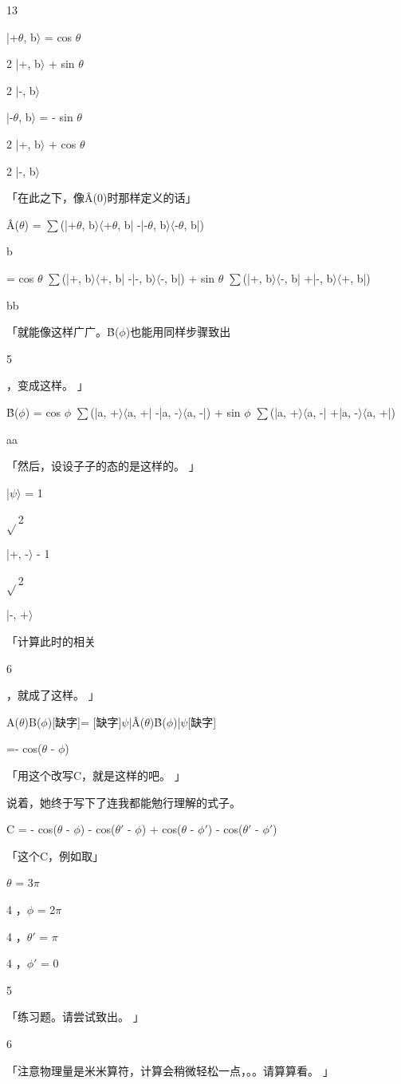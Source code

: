 13\par
|+$\theta$, b$\rangle$ = cos $\theta$\par
2 |+, b$\rangle$ + sin $\theta$\par
2 |-, b$\rangle$\par
|-$\theta$, b$\rangle$ = - sin $\theta$\par
2 |+, b$\rangle$ + cos $\theta$\par
2 |-, b$\rangle$\par
「在此之下，像Â(0)时那样定义的话」\par
Â($\theta$) = $\sum$(|+$\theta$, b$\rangle$$\langle$+$\theta$, b| -|-$\theta$, b$\rangle$$\langle$-$\theta$, b|)\par
b\par
= cos $\theta$ $\sum$(|+, b$\rangle$$\langle$+, b| -|-, b$\rangle$$\langle$-, b|) + sin $\theta$ $\sum$(|+, b$\rangle$$\langle$-, b| +|-, b$\rangle$$\langle$+, b|)\par
bb\par
「就能像这样广广。B̂($\phi$)也能用同样步骤致出\par
5\par
，变成这样。 」\par
B̂($\phi$) = cos $\phi$ $\sum$(|a, +$\rangle$$\langle$a, +| -|a, -$\rangle$$\langle$a, -|) + sin $\phi$ $\sum$(|a, +$\rangle$$\langle$a, -| +|a, -$\rangle$$\langle$a, +|)\par
aa\par
「然后，设设子子的态的是这样的。 」\par
|$\psi$$\rangle$ = 1\par
$\sqrt{}$2\par
|+, -$\rangle$ - 1\par
$\sqrt{}$2\par
|-, +$\rangle$\par
「计算此时的相关\par
6\par
，就成了这样。 」\par
[缺字]A($\theta$)B($\phi$)[缺字]= [缺字]$\psi$|Â($\theta$)B̂($\phi$)|$\psi$[缺字]\par
=- cos($\theta$ - $\phi$)\par
「用这个改写C，就是这样的吧。 」\par
说着，她终于写下了连我都能勉行理解的式子。\par
C = - cos($\theta$ - $\phi$) - cos($\theta$$\prime$ - $\phi$) + cos($\theta$ - $\phi$$\prime$) - cos($\theta$$\prime$ - $\phi$$\prime$)\par
「这个C，例如取」\par
$\theta$ = 3$\pi$\par
4 ，$\phi$ = 2$\pi$\par
4 ，$\theta$$\prime$ = $\pi$\par
4 ，$\phi$$\prime$ = 0\par
5\par
「练习题。请尝试致出。 」\par
6\par
「注意物理量是米米算符，计算会稍微轻松一点，。。请算算看。 」\par

